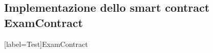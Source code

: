 \begin{appendices}

    \section{Implementazione dello smart contract ExamContract}
    [label=Test]{ExamContract \label{cod:examcontract}}
    \inputminted{solidity}{../contracts/contracts/ExamContract.sol}

\end{appendices}